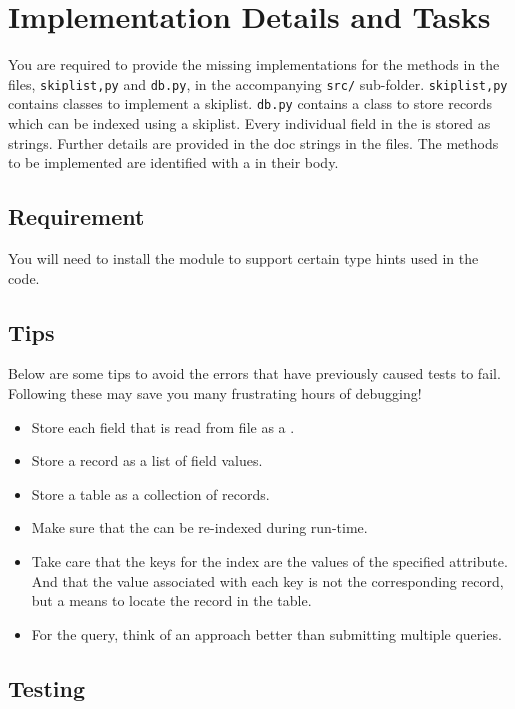 \documentclass[addpoints]{exam}
\begin{document}
\section{Implementation Details and Tasks}

You are required to provide the missing implementations for the methods in the files, \texttt{skiplist,py} and \texttt{db.py}, in the accompanying \texttt{src/} sub-folder. \texttt{skiplist,py} contains classes to implement a skiplist. \texttt{db.py} contains a  class to store records which can be indexed using a skiplist. Every individual field in the  is stored as strings. Further details are provided in the doc strings in the files. The methods to be implemented are identified with a  in their body.

  \subsection{Requirement}

  You will need to install the  module to support certain type hints used in the code.

  \subsection{Tips}

  Below are some tips to avoid the errors that have previously caused tests to fail. Following these may save you many frustrating hours of debugging!
  \begin{itemize}
  \item Store each field that is read from file as a .
  \item Store a record as a list of field values.
  \item Store a table as a collection of records.
  \item Make sure that the  can be re-indexed during run-time.
  \item Take care that the keys for the index are the values of the specified attribute. And that the value associated with each key is not the corresponding record, but a means to locate the record in the table.
  \item For the  query, think of an approach better than submitting multiple  queries.
  \end{itemize}

  \subsection{Testing}
\end{document}
